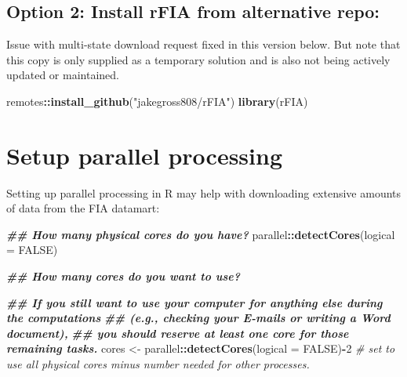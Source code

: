 \documentclass[
]{book}
\newenvironment{Shaded}{\begin{snugshade}}{\end{snugshade}}
\newcommand{\AttributeTok}[1]{\textcolor[rgb]{0.13,0.29,0.53}{#1}}
\newcommand{\CommentTok}[1]{\textcolor[rgb]{0.56,0.35,0.01}{\textit{#1}}}
\newcommand{\ConstantTok}[1]{\textcolor[rgb]{0.56,0.35,0.01}{#1}}
\newcommand{\DecValTok}[1]{\textcolor[rgb]{0.00,0.00,0.81}{#1}}
\newcommand{\DocumentationTok}[1]{\textcolor[rgb]{0.56,0.35,0.01}{\textbf{\textit{#1}}}}
\newcommand{\FunctionTok}[1]{\textcolor[rgb]{0.13,0.29,0.53}{\textbf{#1}}}
\newcommand{\NormalTok}[1]{#1}
\newcommand{\OtherTok}[1]{\textcolor[rgb]{0.56,0.35,0.01}{#1}}
\newcommand{\SpecialCharTok}[1]{\textcolor[rgb]{0.81,0.36,0.00}{\textbf{#1}}}
\newcommand{\StringTok}[1]{\textcolor[rgb]{0.31,0.60,0.02}{#1}}
\begin{document}
\hypertarget{option-2-install-rfia-from-alternative-repo}{%
\subsection{Option 2: Install rFIA from alternative repo:}\label{option-2-install-rfia-from-alternative-repo}}

Issue with multi-state download request fixed in this version below. But note that this copy is only supplied as a temporary solution and is also not being actively updated or maintained.

\begin{Shaded}
\begin{Highlighting}[]
\NormalTok{remotes}\SpecialCharTok{::}\FunctionTok{install\_github}\NormalTok{(}\StringTok{"jakegross808/rFIA"}\NormalTok{)}
\FunctionTok{library}\NormalTok{(rFIA)}
\end{Highlighting}
\end{Shaded}

\hypertarget{setup-parallel-processing}{%
\section{Setup parallel processing}\label{setup-parallel-processing}}

Setting up parallel processing in R may help with downloading extensive amounts of data from the FIA datamart:

\begin{Shaded}
\begin{Highlighting}[]
\DocumentationTok{\#\# How many physical cores do you have?}
\NormalTok{parallel}\SpecialCharTok{::}\FunctionTok{detectCores}\NormalTok{(}\AttributeTok{logical =} \ConstantTok{FALSE}\NormalTok{) }

\DocumentationTok{\#\# How many cores do you want to use?}

\DocumentationTok{\#\# If you still want to use your computer for anything else during the computations }
\DocumentationTok{\#\# (e.g., checking your E{-}mails or writing a Word document), }
\DocumentationTok{\#\# you should reserve at least one core for those remaining tasks.}
\NormalTok{cores }\OtherTok{\textless{}{-}}\NormalTok{ parallel}\SpecialCharTok{::}\FunctionTok{detectCores}\NormalTok{(}\AttributeTok{logical =} \ConstantTok{FALSE}\NormalTok{)}\SpecialCharTok{{-}}\DecValTok{2} \CommentTok{\# set to use all physical cores minus number needed for other processes. }
\end{Highlighting}
\end{Shaded}
\end{document}

